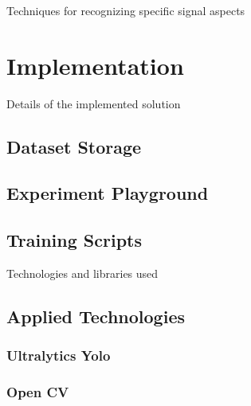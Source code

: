 \documentclass[english, ing, kiv, he, iso690alph, pdf, viewonly]{fasthesis}
\begin{document}
Techniques for recognizing specific signal aspects















\chapter{Implementation}


Details of the implemented solution
\section{Dataset Storage}

\section{Experiment Playground}

\section{Training Scripts}


Technologies and libraries used
\section{Applied Technologies}

\subsection{Ultralytics Yolo}

\subsection{Open CV}
\end{document}
